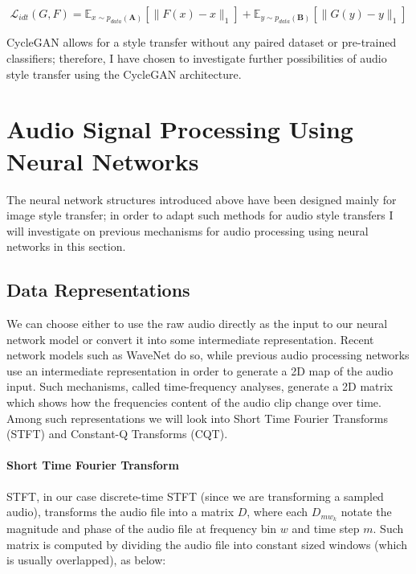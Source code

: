 \documentclass[]{report}
\begin{document}
\begin{equation}
    \mathcal{L}_{idt}(G, F) = \mathbb{E}_{x \sim p_{data}(\mathbf{A})}[\|F(x) - x\|_1] + \mathbb{E}_{y \sim p_{data}(\mathbf{B})}[\|G(y) - y\|_1]
\end{equation}

CycleGAN allows for a style transfer without any paired dataset or
pre-trained classifiers; therefore, I have chosen to investigate further
possibilities of audio style transfer using the CycleGAN architecture.

\hypertarget{audio-signal-processing-using-neural-networks}{%
\section{Audio Signal Processing Using Neural
Networks}\label{audio-signal-processing-using-neural-networks}}

The neural network structures introduced above have been designed mainly
for image style transfer; in order to adapt such methods for audio style
transfers I will investigate on previous mechanisms for audio processing
using neural networks in this section.

\hypertarget{data-representations}{%
\subsection{Data Representations}\label{data-representations}}

We can choose either to use the raw audio directly as the input to our
neural network model or convert it into some intermediate
representation. Recent network models such as WaveNet do so, while
previous audio processing networks use an intermediate representation in
order to generate a 2D map of the audio input. Such mechanisms, called
time-frequency analyses, generate a 2D matrix which shows how the
frequencies content of the audio clip change over time. Among such
representations we will look into Short Time Fourier Transforms (STFT)
and Constant-Q Transforms (CQT).

\paragraph{Short Time Fourier Transform}

STFT, in our case discrete-time STFT (since we are transforming a
sampled audio), transforms the audio file into a matrix \(D\), where
each \(D_{mw_{k}}\) notate the magnitude and phase of the audio file at
frequency bin \(w\) and time step \(m\). Such matrix is computed by
dividing the audio file into constant sized windows (which is usually
overlapped), as below:
\end{document}
